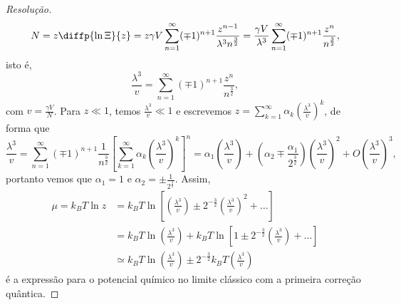 \begin{proof}[Resolução]
    \begin{equation*}
        N = z \diffp{\ln \Xi}{z} = z\gamma V \sum_{n=1}^\infty (\mp1)^{n+1} \frac{z^{n-1}}{\lambda^3 n^{\frac32}} = \frac{\gamma V}{\lambda^3} \sum_{n =1}^\infty (\mp1)^{n+1} \frac{z^n}{n^{\frac32}},
    \end{equation*}
    isto é,
    \begin{equation*}
        \frac{\lambda^3}{v} = \sum_{n = 1}^\infty (\mp 1)^{n+1} \frac{z^n}{n^{\frac{3}{2}}},
    \end{equation*}
    com \(v = \frac{\gamma V}{N}\). Para \(z \ll 1\), temos \(\frac{\lambda^3}{v} \ll 1\) e escrevemos \(z = \sum_{k = 1}^{\infty} \alpha_k \left(\frac{\lambda^3}{v}\right)^k\), de forma que
    \begin{equation*}
        \frac{\lambda^3}{v} = \sum_{n = 1}^\infty (\mp 1)^{n+1} \frac{1}{n^{\frac32}} \left[\sum_{k = 1}^\infty \alpha_k \left(\frac{\lambda^3}{v}\right)^k\right]^n = \alpha_1 \left(\frac{\lambda^3}{v}\right) + \left(\alpha_2 \mp \frac{\alpha_1}{2^{\frac32}}\right)\left(\frac{\lambda^3}{v}\right)^2 + O\left(\frac{\lambda^3}{v}\right)^3,
    \end{equation*}
    portanto vemos que \(\alpha_1 = 1\) e \(\alpha_2 = \pm \frac{1}{2^{\frac32}}\). Assim,
    \begin{align*}
        \mu = k_B T \ln z &= k_B T \ln\left[\left(\frac{\lambda^3}{v}\right) \pm 2^{-\frac32}\left(\frac{\lambda^3}{v}\right)^2 + \dots\right]\\
                          &= k_BT \ln\left(\frac{\lambda^3}{v}\right) + k_BT \ln\left[1 \pm 2^{-\frac32} \left(\frac{\lambda^3}{v}\right) + \dots\right]\\
                          &\simeq k_B T \ln\left(\frac{\lambda^3}{v}\right)  \pm 2^{-\frac32} k_B T \left(\frac{\lambda^3}{v}\right)
    \end{align*}
    é a expressão para o potencial químico no limite clássico com a primeira correção quântica.
\end{proof}
